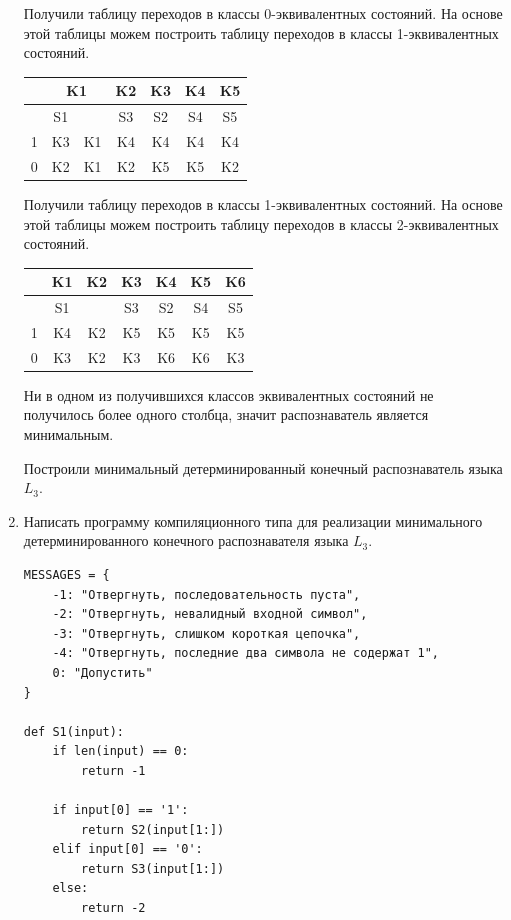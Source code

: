 \documentclass[a4paper,14pt]{extarticle}
\begin{document}
\begin{enumerate}[1.]
Получили таблицу переходов в классы 0-эквивалентных состояний. На основе 
этой таблицы можем построить таблицу переходов в классы 1-эквивалентных 
состояний. 

\begin{tabular}{|c|c|c|c|c|c|c|}
    \hline
    & \multicolumn{2}{c|}{K1} & K2 & K3 & K4 & K5 \\
    \hline
      & S1 &    & S3 & S2 & S4 & S5 \\
    \hline
    1 & K3 & K1 & K4 & K4 & K4 & K4 \\
    \hline
    0 & K2 & K1 & K2 & K5 & K5 & K2 \\
    \hline
\end{tabular}

Получили таблицу переходов в классы 1-эквивалентных состояний. На основе 
этой таблицы можем построить таблицу переходов в классы 2-эквивалентных 
состояний. 

\begin{tabular}{|c|c|c|c|c|c|c|}
    \hline
      & K1 & K2 & K3 & K4 & K5 & K6 \\
    \hline
      & S1 &    & S3 & S2 & S4 & S5 \\
    \hline
    1 & K4 & K2 & K5 & K5 & K5 & K5 \\
    \hline
    0 & K3 & K2 & K3 & K6 & K6 & K3 \\
    \hline
\end{tabular}

Ни в одном из получившихся классов эквивалентных состояний не получилось
более одного столбца, значит распознаватель является минимальным. 

Построили минимальный детерминированный конечный распознаватель языка $L_3$.

\item Написать программу компиляционного типа для реализации
минимального детерминированного конечного распознавателя языка $L_3$.

\begin{verbatim}
MESSAGES = {
    -1: "Отвергнуть, последовательность пуста",
    -2: "Отвергнуть, невалидный входной символ",
    -3: "Отвергнуть, слишком короткая цепочка",
    -4: "Отвергнуть, последние два символа не содержат 1",
    0: "Допустить"
}

def S1(input):
    if len(input) == 0:
        return -1

    if input[0] == '1':
        return S2(input[1:])
    elif input[0] == '0':
        return S3(input[1:])
    else:
        return -2


\end{verbatim}
\end{enumerate}
\end{document}
